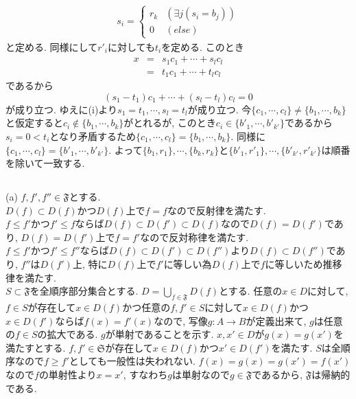 \documentclass{jsarticle}
\begin{document}
\begin{eqnarray*}
	s_i = \begin{cases}
		r_k & (\exists j(s_i = b_j))\\
		0 & (else)
	\end{cases}
\end{eqnarray*}
と定める. 同様にして$r'_i$に対しても$t_i$を定める. このとき
\begin{eqnarray*}
	x
	&=& s_1 c_1 + \cdots + s_l c_l\\
	&=& t_1 c_1 + \cdots + t_l c_l
\end{eqnarray*}
であるから
\begin{equation*}
	(s_1 - t_1) c_1 + \cdots + (s_l - t_l) c_l = 0
\end{equation*}
が成り立つ. ゆえに(i)より$s_1 = t_1, \cdots, s_l = t_l$が成り立つ. 今$\{c_1, \cdots, c_l\} \neq \{b_1, \cdots, b_k\}$と仮定すると$c_i \notin \{b_1, \cdots, b_k\}$がとれるが, このとき$c_i \in \{b'_1, \cdots, b'_{k'}\}$であるから$s_i = 0 < t_i$となり矛盾するため$\{c_1, \cdots, c_l\} = \{b_1, \cdots, b_k\}$. 同様に$\{c_1, \cdots, c_l\} = \{b'_1, \cdots, b'_{k'}\}$. よって$\{b_1, r_1\},\cdots, \{b_k, r_k\}$と$\{b'_1, r'_1\}, \cdots, \{b'_{k'}, r'_{k'}\}$は順番を除いて一致する.

\subsection{} %
(a) $f, f', f'' \in \mathfrak{F}$とする. \\
$D(f) \subset D(f)$かつ$D(f)$上で$f = f$なので反射律を満たす.\\
$f \le f'$かつ$f' \le f$ならば$D(f) \subset D(f') \subset D(f)$なので$D(f) = D(f')$であり, $D(f) = D(f')$上で$f = f'$なので反対称律を満たす.\\
$f \le f'$かつ$f' \le f''$ならば$D(f) \subset D(f') \subset D(f'')$より$D(f) \subset D(f'')$であり, $f''$は$D(f')$上, 特に$D(f)$上で$f'$に等しい為$D(f)$上で$f$に等しいため推移律を満たす.\\

$S \subset \mathfrak{F}$を全順序部分集合とする. $D = \bigcup_{f \in \mathfrak{F}} D(f)$とする. 任意の$x \in D$に対して, $f \in S$が存在して$x \in D(f)$かつ任意の$f, f' \in S$に対して$x \in D(f)$かつ$x \in D(f')$ならば$f(x) = f'(x)$なので, 写像$g:A \rightarrow B$が定義出来て, $g$は任意の$f \in S$の拡大である. $g$が単射であることを示す. $x, x' \in D$が$g(x) = g(x')$を満たすとする. $f, f' \in \mathfrak{S}$が存在して$x \in D(f)$かつ$x' \in D(f')$を満たす. $S$は全順序なので$f \ge f'$としても一般性は失われない. $f(x) = g(x) = g(x') = f(x')$なので$f$の単射性より$x = x'$, すなわち$g$は単射なので$g \in \mathfrak{F}$であるから, $\mathfrak{F}$は帰納的である.
\end{document}
